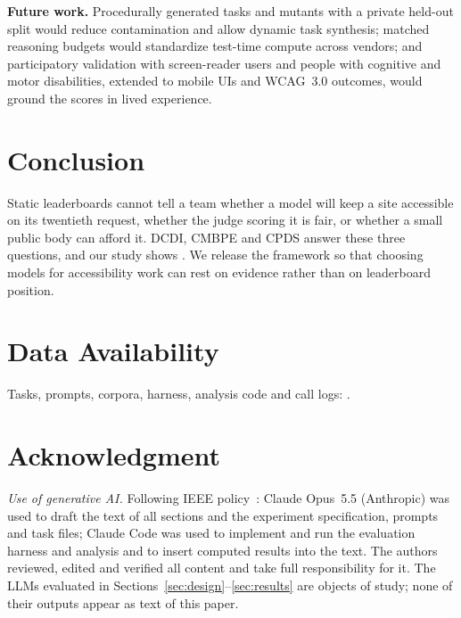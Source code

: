 \documentclass[10pt,conference]{IEEEtran}
\begin{document}
\textbf{Future work.} Procedurally generated tasks and mutants with a private held-out split would reduce contamination and allow dynamic task synthesis; matched reasoning budgets would standardize test-time compute across vendors; and participatory validation with screen-reader users and people with cognitive and motor disabilities, extended to mobile UIs and WCAG~3.0 outcomes, would ground the scores in lived experience.

\section{Conclusion}\label{sec:conclusion}

Static leaderboards cannot tell a team whether a model will keep a site accessible on its twentieth request, whether the judge scoring it is fair, or whether a small public body can afford it. DCDI, CMBPE and CPDS answer these three questions, and our study shows . We release the framework so that choosing models for accessibility work can rest on evidence rather than on leaderboard position.

\section*{Data Availability}
Tasks, prompts, corpora, harness, analysis code and call logs: .

\section*{Acknowledgment}
\emph{Use of generative AI.} Following IEEE policy~\cite{ieeeai}: Claude Opus~5.5 (Anthropic) was used to draft the text of all sections and the experiment specification, prompts and task files; Claude Code was used to implement and run the evaluation harness and analysis and to insert computed results into the text. The authors reviewed, edited and verified all content and take full responsibility for it. The LLMs evaluated in Sections~\ref{sec:design}--\ref{sec:results} are objects of study; none of their outputs appear as text of this paper. 



\end{document}
